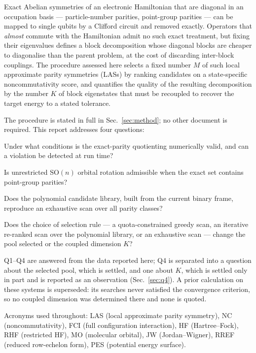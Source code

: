 \documentclass[11pt]{article}
\begin{document}
Exact Abelian symmetries of an electronic Hamiltonian that are diagonal in an
occupation basis --- particle-number parities, point-group parities --- can be
mapped to single qubits by a Clifford circuit and removed exactly. Operators
that \emph{almost} commute with the Hamiltonian admit no such exact treatment,
but fixing their eigenvalues defines a block decomposition whose diagonal
blocks are cheaper to diagonalise than the parent problem, at the cost of
discarding inter-block couplings. The procedure assessed here selects a fixed
number $M$ of such local approximate parity symmetries (LASs) by ranking
candidates on a state-specific noncommutativity score, and quantifies the
quality of the resulting decomposition by the number $K$ of block eigenstates
that must be recoupled to recover the target energy to a stated tolerance.

The procedure is stated in full in Sec.~\ref{sec:method}; no other document is
required. This report addresses four questions:

\begin{description}[leftmargin=2.6em,style=nextline,itemsep=2pt]
\item[Q1] Under what conditions is the exact-parity quotienting numerically
  valid, and can a violation be detected at run time?
\item[Q2] Is unrestricted $\mathrm{SO}(n)$ orbital rotation admissible when the
  exact set contains point-group parities?
\item[Q3] Does the polynomial candidate library, built from the current binary
  frame, reproduce an exhaustive scan over all parity classes?
\item[Q4] Does the choice of selection rule --- a quota-constrained greedy
  scan, an iterative re-ranked scan over the polynomial library, or an
  exhaustive scan --- change the pool selected or the coupled dimension $K$?
\end{description}

\noindent
Q1--Q4 are answered from the data reported here; Q4 is separated into a
question about the selected pool, which is settled, and one about $K$, which is
settled only in part and is reported as an observation (Sec.~\ref{sec:q4}). A
prior calculation on these systems is superseded: its searches never satisfied
the convergence criterion, so no coupled dimension was determined there and
none is quoted.

Acronyms used throughout: LAS (local approximate parity symmetry), NC
(noncommutativity), FCI (full configuration interaction), HF (Hartree--Fock),
RHF (restricted HF), MO (molecular orbital), JW (Jordan--Wigner), RREF (reduced
row-echelon form), PES (potential energy surface).
\end{document}
